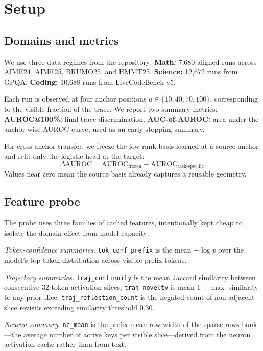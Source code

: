 \documentclass[10pt,twocolumn]{article}
\begin{document}
\section{Setup}
\label{sec:setup}

\subsection{Domains and metrics}

We use three data regimes from the repository:
\textbf{Math:} 7,680 aligned runs across AIME24, AIME25, BRUMO25, and HMMT25.
\textbf{Science:} 12,672 runs from GPQA.
\textbf{Coding:} 10,688 runs from LiveCodeBench-v5.

Each run is observed at four anchor positions $a \in \{10, 40, 70, 100\}$, corresponding to the visible fraction of the trace. We report two summary metrics:
\textbf{AUROC@100\%:} final-trace discrimination.
\textbf{AUC-of-AUROC:} area under the anchor-wise AUROC curve, used as an early-stopping summary.

For cross-anchor transfer, we freeze the low-rank basis learned at a source anchor and refit only the logistic head at the target:
\[
\Delta\mathrm{AUROC} = \mathrm{AUROC}_{\text{frozen}} - \mathrm{AUROC}_{\text{task-specific}}.
\]
Values near zero mean the source basis already captures a reusable geometry.

\subsection{Feature probe}
\label{sec:probe}

The probe uses three families of cached features, intentionally kept cheap to isolate the domain effect from model capacity:

\textit{Token-confidence summaries.} \texttt{tok\_conf\_prefix} is the mean $-\log p$ over the model's top-token distribution across visible prefix tokens.

\textit{Trajectory summaries.} \texttt{traj\_continuity} is the mean Jaccard similarity between consecutive 32-token activation slices; \texttt{traj\_novelty} is mean $1-\max$ similarity to any prior slice; \texttt{traj\_reflection\_count} is the negated count of non-adjacent slice revisits exceeding similarity threshold $0.30$.

\textit{Neuron-summary.} \texttt{nc\_mean} is the prefix mean row width of the sparse rows-bank---the average number of active keys per visible slice---derived from the neuron activation cache rather than from text.
\end{document}
